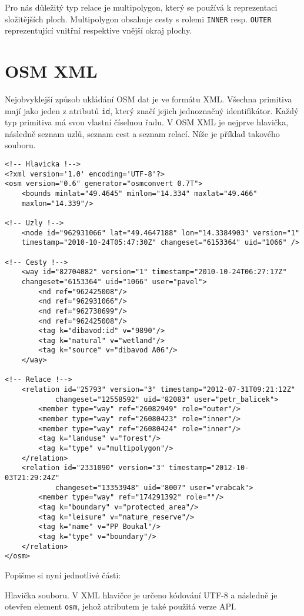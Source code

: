 Pro nás důležitý typ relace je multipolygon, který se používá k reprezentaci
složitějších ploch. Multipolygon obsahuje cesty s rolemi \verb|INNER| resp.
\verb|OUTER| reprezentující vnitřní respektive vnější okraj plochy.

\section{OSM XML}
Nejobvyklejší způsob ukládání OSM dat je ve formátu XML. Všechna primitiva mají
jako jeden z atributů \verb|id|, který značí jejich jednoznačný identifikátor.
Každý typ primitiva má svou vlastní číselnou řadu. V OSM XML\cite{osmxml} je
nejprve hlavička, následně seznam uzlů, seznam cest a seznam relací. Níže je
příklad takového souboru.

\begin{verbatim}
<!-- Hlavicka !-->
<?xml version='1.0' encoding='UTF-8'?>
<osm version="0.6" generator="osmconvert 0.7T">
	<bounds minlat="49.4645" minlon="14.334" maxlat="49.466" 
	maxlon="14.339"/>

<!-- Uzly !-->
	<node id="962931066" lat="49.4647188" lon="14.3384903" version="1" 
	timestamp="2010-10-24T05:47:30Z" changeset="6153364" uid="1066" />

<!-- Cesty !-->
	<way id="82704082" version="1" timestamp="2010-10-24T06:27:17Z" 
	changeset="6153364" uid="1066" user="pavel">
		<nd ref="962425008"/>
		<nd ref="962931066"/>
		<nd ref="962738699"/>
		<nd ref="962425008"/>
		<tag k="dibavod:id" v="9890"/>
		<tag k="natural" v="wetland"/>
		<tag k="source" v="dibavod A06"/>
	</way>

<!-- Relace !-->
	<relation id="25793" version="3" timestamp="2012-07-31T09:21:12Z" 
			changeset="12558592" uid="82083" user="petr_balicek">
		<member type="way" ref="26082949" role="outer"/>
		<member type="way" ref="26080423" role="inner"/>
		<member type="way" ref="26080424" role="inner"/>
		<tag k="landuse" v="forest"/>
		<tag k="type" v="multipolygon"/>
	</relation>
	<relation id="2331090" version="3" timestamp="2012-10-03T21:29:24Z"
			changeset="13353948" uid="8007" user="vrabcak">
		<member type="way" ref="174291392" role=""/>
		<tag k="boundary" v="protected_area"/>
		<tag k="leisure" v="nature_reserve"/>
		<tag k="name" v="PP Boukal"/>
		<tag k="type" v="boundary"/>
	</relation>
</osm>
\end{verbatim}

Popišme si nyní jednotlivé části:

{\tuc Hlavička souboru.} V XML hlavičce je určeno kódování UTF-8 a následně je
otevřen element \verb|osm|, jehož atributem je také použitá verze API. 

